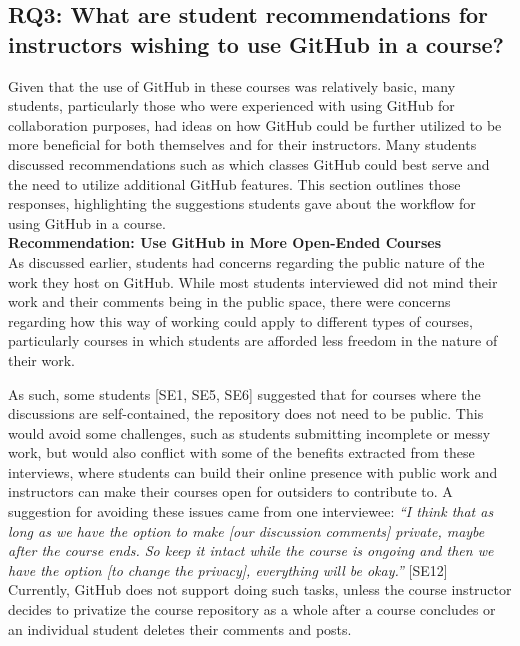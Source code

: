\subsection{RQ3: What are student recommendations for instructors wishing to use GitHub in a course?}

Given that the use of GitHub in these courses was relatively basic, many students, particularly those who were experienced with using GitHub for collaboration purposes, had ideas on how GitHub could be further utilized to be more beneficial for both themselves and for their instructors. Many students discussed recommendations such as which classes GitHub could best serve and the need to utilize additional GitHub features. This section outlines those responses, highlighting the suggestions students gave about the workflow for using GitHub in a course. \\

\textbf{Recommendation: Use GitHub in More Open-Ended Courses} \\
As discussed earlier, students had concerns regarding the public nature of the work they host on GitHub. While most students interviewed did not mind their work and their comments being in the public space, there were concerns regarding how this way of working could apply to different types of courses, particularly courses in which students are afforded less freedom in the nature of their work. %

As such, some students [SE1, SE5, SE6] suggested that for courses where the discussions are self-contained, the repository does not need to be public. This would avoid some challenges, such as students submitting incomplete or messy work, but would also conflict with some of the benefits extracted from these interviews, where students can build their online presence with public work and instructors can make their courses open for outsiders to contribute to. A suggestion for avoiding these issues came from one interviewee: \textit{``I think that as long as we have the option to make [our discussion comments] private, maybe after the course ends. So keep it intact while the course is ongoing and then we have the option [to change the privacy], everything will be okay.''} [SE12] Currently, GitHub does not support doing such tasks, unless the course instructor decides to privatize the course repository as a whole after a course concludes or an individual student deletes their comments and posts. %

